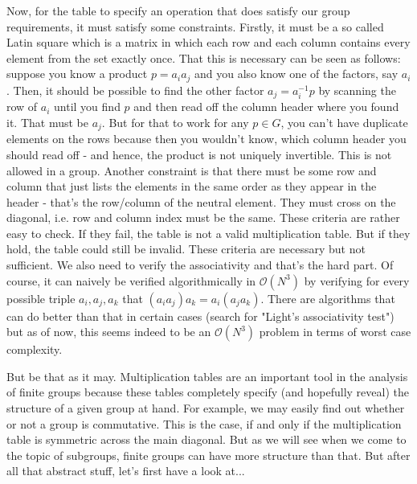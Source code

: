 \medskip
Now, for the table to specify an operation that does satisfy our group requirements, it must satisfy some constraints. Firstly, it must be a so called Latin square which is a matrix in which each row and each column contains every element from the set exactly once. That this is necessary can be seen as follows: suppose you know a product $p = a_i a_j$ and you also know one of the factors, say $a_i$. Then, it should be possible to find the other factor $a_j = a_i^{-1} p$ by scanning the row of $a_i$ until you find $p$ and then read off the column header where you found it. That must be $a_j$. But for that to work for any $p \in G$, you can't have duplicate elements on the rows because then you wouldn't know, which column header you should read off - and hence, the product is not uniquely invertible. This is not allowed in a group. Another constraint is that there must be some row and column that just lists the elements in the same order as they appear in the header - that's the row/column of the neutral element. They must cross on the diagonal, i.e. row and column index must be the same. These criteria are rather easy to check. If they fail, the table is not a valid multiplication table. But if they hold, the table could still be invalid. These criteria are necessary but not sufficient. We also need to verify the associativity and that's the hard part. Of course, it can naively be verified algorithmically in $\mathcal{O}(N^3)$ by verifying for every possible triple $a_i, a_j, a_k$ that $(a_i a_j) a_k = a_i (a_j a_k)$. There are algorithms that can do better than that in certain cases (search for "Light's associativity test") but as of now, this seems indeed to be an $\mathcal{O}(N^3)$ problem in terms of worst case complexity.

\medskip
But be that as it may. Multiplication tables are an important tool in the analysis of finite groups because these tables completely specify (and hopefully reveal) the structure of a given group at hand. For example, we may easily find out whether or not a group is commutative. This is the case, if and only if the multiplication table is symmetric across the main diagonal. But as we will see when we come to the topic of subgroups, finite groups can have more structure than that. But after all that abstract stuff, let's first have a look at...



